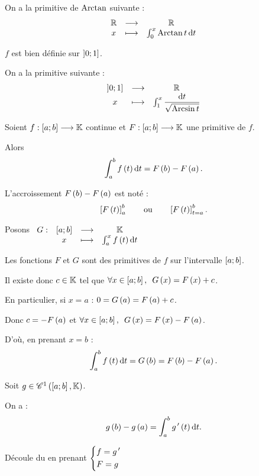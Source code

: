 \begin{corr}[1]
On a la primitive de \(\operatorname{Arctan}\) suivante : \[\fonctionlambda{\R}{\R}{x}{\int_0^x\Arctan t\odif{t}}\]
\end{corr}

\begin{corr}[2]
\(f\) est bien définie sur \(\left]0;1\right]\).

On a la primitive suivante : \[\fonctionlambda{\intervei{0}{1}}{\R}{x}{\int_1^x\dfrac{\odif{t}}{\sqrt{\Arcsin t}}}\]
\end{corr}

\begin{cor}
Soient \(f:\left[a;b\right]\longrightarrow\mathbb{K}\) continue et \(F:\left[a;b\right]\longrightarrow\mathbb{K}\) une primitive de \(f\).

Alors \[\int_a^bf\paren{t}\odif{t}=F\paren{b}-F\paren{a}.\]

L'accroissement \(F\left(b\right)-F\left(a\right)\) est noté : \[\left[F\left(t\right)\right]_a^b\qquad\text{ou}\qquad\left[F\left(t\right)\right]_{t=a}^b.\]
\end{cor}

\begin{dem}
Posons \(\fonction{G}{\intervii{a}{b}}{\K}{x}{\int_a^xf\paren{t}\odif{t}}\)

Les fonctions \(F\) et \(G\) sont des primitives de \(f\) sur l'intervalle \(\left[a;b\right]\).

Il existe donc \(c\in\mathbb{K}\) tel que \(\quantifs{\forall x\in\intervii{a}{b}}G\paren{x}=F\paren{x}+c\).

En particulier, si \(x=a\) : \(0=G\left(a\right)=F\left(a\right)+c\).

Donc \(c=-F\left(a\right)\) et \(\quantifs{\forall x\in\intervii{a}{b}}G\paren{x}=F\paren{x}-F\paren{a}\).

D'où, en prenant \(x=b\) : \[\int_a^bf\paren{t}\odif{t}=G\paren{b}=F\paren{b}-F\paren{a}.\]
\end{dem}

\begin{cor}
Soit \(g\in\mathscr{C}^{1}\left(\left[a;b\right],\mathbb{K}\right)\).

On a : \[g\paren{b}-g\paren{a}=\int_a^bg\prim\paren{t}\odif{t}.\]
\end{cor}

\begin{dem}
Découle du  en prenant \(\begin{dcases}f=g^{\,\prime} \\ F=g\end{dcases}\)
\end{dem}

